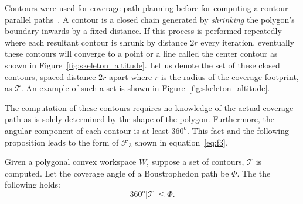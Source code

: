 \documentclass[../main.tex]{subfiles}
\begin{document}
Contours were used for coverage path planning before for computing a contour-parallel paths~\cite{held1991computational}. A contour is a closed chain generated by \emph{shrinking} the polygon's boundary inwards by a fixed distance. If this process is performed repeatedly where each resultant contour is shrunk by distance $2r$ every iteration, eventually these contours will converge to a point or a line called the center contour as shown in Figure~\ref{fig:skeleton_altitude}. Let us denote the set of these closed contours, spaced distance $2r$ apart where $r$ is the radius of the coverage footprint, as $\mathcal{T}$. An example of such a set is shown in Figure~\ref{fig:skeleton_altitude}.

The computation of these contours requires no knowledge of the actual coverage path as is solely determined by the shape of the polygon. Furthermore, the angular component of each contour is at least $360^o$. This fact and the following proposition leads to the form of $\mathcal{F}_3$ shown in equation~\ref{eq:f3}.

\begin{proposition}
	Given a polygonal convex workspace $W$, suppose a set of contours, $\mathcal{T}$ is computed. Let the coverage angle of a Boustrophedon path be $\Phi$. The the following holds:
	\begin{equation}
		360^o|\mathcal{T}|\leq\Phi.
	\end{equation}
\end{proposition}
\end{document}
